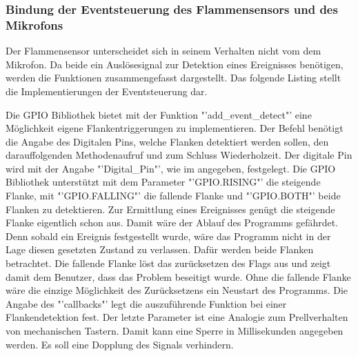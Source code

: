 \subsubsection*{Bindung der Eventsteuerung des Flammensensors und des Mikrofons}
	Der Flammensensor unterscheidet sich in seinem Verhalten nicht vom dem Mikrofon. Da beide ein Auslösesignal zur Detektion eines Ereignisses benötigen, werden die Funktionen zusammengefasst dargestellt. Das folgende Listing stellt die Implementierungen der Eventsteuerung dar.
	
	Die GPIO Bibliothek bietet mit der Funktion "'add\_event\_detect"' eine Möglichkeit eigene Flankentriggerungen zu implementieren. Der Befehl benötigt die Angabe des Digitalen Pins, welche Flanken detektiert werden sollen, den darauffolgenden Methodenaufruf und zum Schluss Wiederholzeit. Der digitale Pin wird mit der Angabe "'Digital\_Pin"', wie im  angegeben, festgelegt. Die GPIO Bibliothek unterstützt mit dem Parameter "'GPIO.RISING"' die steigende Flanke, mit "'GPIO.FALLING"' die fallende Flanke und "'GPIO.BOTH"' beide Flanken zu detektieren. Zur Ermittlung eines Ereignisses genügt die steigende Flanke eigentlich schon aus. Damit wäre der Ablauf des Programms gefährdet. Denn sobald ein Ereignis festgestellt wurde, wäre das Programm nicht in der Lage diesen gesetzten Zustand zu verlassen. Dafür werden beide Flanken betrachtet. Die fallende Flanke löst das zurücksetzen des Flags aus und zeigt damit dem Benutzer, dass das Problem beseitigt wurde. Ohne die fallende Flanke wäre die einzige Möglichkeit des Zurücksetzens ein Neustart des Programms. Die Angabe des "'callbacks"' legt die auszuführende Funktion bei einer Flankendetektion fest. Der letzte Parameter ist eine Analogie zum Prellverhalten von mechanischen Tastern. Damit kann eine Sperre in Millisekunden angegeben werden. Es soll eine Dopplung des Signals verhindern.
